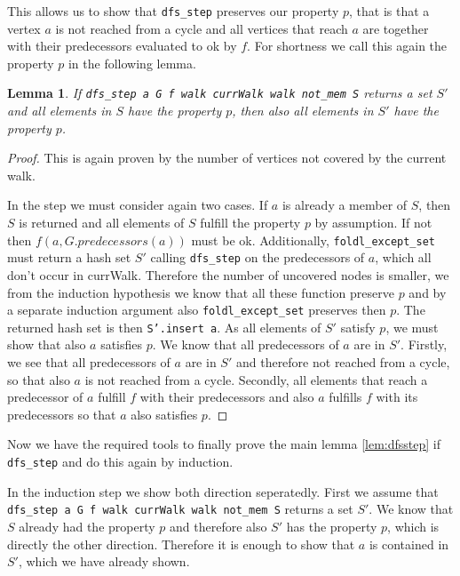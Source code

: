 \documentclass{article}
\newtheorem{lemma}{Lemma}
\begin{document}
        This allows us to show that \texttt{dfs\_step} preserves our property $p$, that is that a vertex $a$ is not reached from a cycle and all vertices that reach $a$ are together with their predecessors evaluated to ok by $f$. For shortness we call this again the property $p$ in the following lemma.

        \begin{lemma}
            If \texttt{dfs\_step a G f walk currWalk walk not\_mem S} returns a set $S'$ and all elements in $S$ have the property $p$, then also all elements in $S'$ have the property $p$.
        \end{lemma}
        \begin{proof}
            This is again proven by the number of vertices not covered by the current walk. 

            In the step we must consider again two cases. If $a$ is already a member of $S$, then $S$ is returned and all elements of $S$ fulfill the property $p$ by assumption. If not then $f(a, G.predecessors(a))$ must be ok. Additionally, \texttt{foldl\_except\_set} must return a hash set $S'$ calling \texttt{dfs\_step} on the predecessors of $a$, which all don't occur in currWalk. Therefore the number of uncovered nodes is smaller, we from the induction hypothesis we know that all these function preserve $p$ and by a separate induction argument also \texttt{foldl\_except\_set} preserves then $p$. The returned hash set is then \texttt{S'.insert a}. As all elements of $S'$ satisfy $p$, we must show that also $a$ satisfies $p$. We know that all predecessors of $a$ are in $S'$.  Firstly, we see that all predecessors of $a$ are in $S'$ and therefore not reached from a cycle, so that also $a$ is not reached from a cycle. Secondly, all elements that reach a predecessor of $a$ fulfill $f$ with their predecessors and also $a$ fulfills $f$ with its predecessors so that $a$ also satisfies $p$.
        \end{proof}

        Now we have the required tools to finally prove the main lemma \ref{lem:dfsstep} if \texttt{dfs\_step} and do this again by induction.
        
        In the induction step we show both direction seperatedly. First we assume that \texttt{dfs\_step a G f walk currWalk walk not\_mem S} returns a set $S'$. We know that $S$ already had the property $p$ and therefore also $S'$ has the property $p$, which is directly the other direction. Therefore it is enough to show that $a$ is contained in $S'$, which we have already shown.
\end{document}
